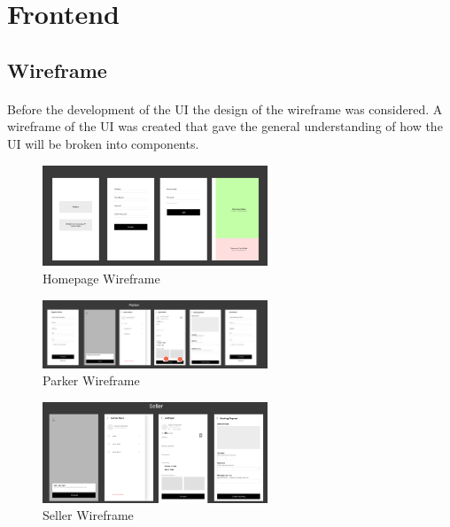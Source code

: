         \pagebreak

        \section{Frontend}
           \subsection{Wireframe}
                \paragraph*{}
                    Before the development of the UI the design of the wireframe was considered. A wireframe of the UI was created that gave the general understanding of how the UI will be broken into components.

                    \begin{figure}[h]
                        \centering
                        \includegraphics[width=0.6\textwidth]{images/homepageWireframe.png}
                        \caption{Homepage Wireframe}
                        \label{fig:homepageWireframe}
                    \end{figure}
 
                    \begin{figure}[h]
                        \centering
                        \includegraphics[width=0.6\textwidth]{images/parkerWireframe.png}
                        \caption{Parker Wireframe}
                        \label{fig:parkerWireframe}
                    \end{figure}

                    \begin{figure}[h]
                        \centering
                        \includegraphics[width=0.6\textwidth]{images/sellerWireframe.png}
                        \caption{Seller Wireframe}
                        \label{fig:sellerWireframe}
                    \end{figure}



